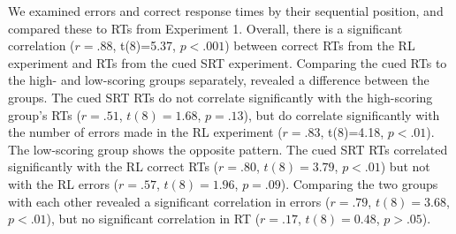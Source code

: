 \documentclass[man,floatsintext]{apa6}
\begin{document}
We examined errors and correct response times by their sequential position, and compared these to RTs from Experiment 1. Overall, there is a significant correlation ($r=.88$, t(8)=5.37, $p<.001$) between correct RTs from the RL experiment and RTs from the cued SRT experiment. Comparing the cued RTs to the high- and low-scoring groups separately, revealed a difference between the groups. The cued SRT RTs do not correlate significantly with the high-scoring group's RTs ($r=.51$, $t(8)=1.68$, $p=.13$), but do correlate significantly with the number of errors made in the RL experiment ($r=.83$, t(8)=4.18, $p<.01$). The low-scoring group shows the opposite pattern. The cued SRT RTs correlated significantly with the RL correct RTs ($r=.80$, $t(8)=3.79$, $p<.01$) but not with the RL errors ($r=.57$, $t(8)=1.96$, $p=.09$). Comparing the two groups with each other revealed a significant correlation in errors ($r=.79$, $t(8)=3.68$, $p<.01$), but no significant correlation in RT ($r=.17$, $t(8)=0.48$, $p>.05$).



\end{document}
